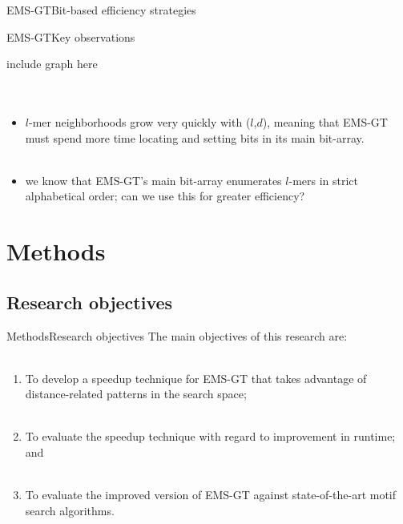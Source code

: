 \documentclass[pdf,xcolor={dvipsnames}]{beamer}
\begin{document}
\begin{frame}{EMS-GT}{Bit-based efficiency strategies}
\begin{itemize}
{			}
		\end{itemize}
		\end{frame}

	\begin{frame}{EMS-GT}{Key observations}

		{\centering include graph here\\ \ \\ \ \\}

		\begin{itemize}
		\item $l$-mer neighborhoods grow very quickly with ($l$,$d$), meaning that EMS-GT must spend more time locating and setting bits in its main bit-array.\\ \ \\
		\item we know that EMS-GT's main bit-array enumerates $l$-mers in strict alphabetical order; {\color{blue} can we use this for greater efficiency}?
		\end{itemize}
		\end{frame}

\section{Methods}
	\subsection{Research objectives}
	\begin{frame}{Methods}{Research objectives}
		The main objectives of this research are:\\ \ \\
		\begin{enumerate}
		\item To develop a speedup technique for EMS-GT that takes advantage of distance-related patterns in the search space;\\ \ \\
		\item To evaluate the speedup technique with regard to improvement in runtime; and\\ \ \\
		\item To evaluate the improved version of EMS-GT against state-of-the-art motif search algorithms.
		\end{enumerate}
		\end{frame}
	
\end{document}
